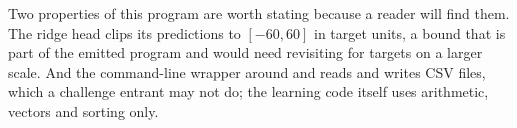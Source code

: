 


Two properties of this program are worth stating because a reader will find them. The ridge head
clips its predictions to $[-60, 60]$ in target units, a bound that is part of the emitted program and
would need revisiting for targets on a larger scale. And the command-line wrapper around 
and  reads and writes CSV files, which a challenge entrant may not do; the learning code
itself uses arithmetic, vectors and sorting only.
